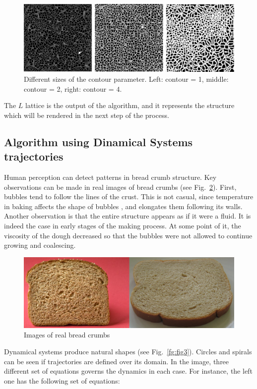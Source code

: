 \documentclass[oneside,a4paper,english,links]{amca}
\begin{document}
\begin{figure}[htb!]
\centerline{\includegraphics[scale=0.22]{fig1.pdf}}
\caption{Different sizes of the contour parameter. Left: contour = 1, middle: contour = 2, right: contour = 4.}
\label{fg:fig1}
\end{figure}

The $L$ lattice is the output of the algorithm, and it represents the structure which will be rendered in the next step of the process.

\subsection{Algorithm using Dinamical Systems trajectories}

Human perception can detect patterns in bread crumb structure. Key observations can be made in real images of bread crumbs (see Fig.~\ref{fg:fig2}). First, bubbles tend to follow the lines of the crust. This is not casual, since temperature in baking affects the shape of bubbles \citep{Scanlon2001}, and elongates them following its walls. Another observation is that the entire structure appears as if it were a fluid. It is indeed the case in early stages of the making process. At some point of it, the viscosity of the dough decreased so that the bubbles were not allowed to continue growing and coalescing.

\begin{figure}[htb!]
\centerline{\includegraphics[scale=0.45]{fig2}}
\caption{Images of real bread crumbs}
\label{fg:fig2}
\end{figure}

Dynamical systems produce natural shapes (see Fig.~\ref{fg:fig3}). Circles and spirals can be seen if trajectories are defined over its domain. In the image, three different set of equations governs the dynamics in each case. For instance, the left one has the following set of equations:
\end{document}
